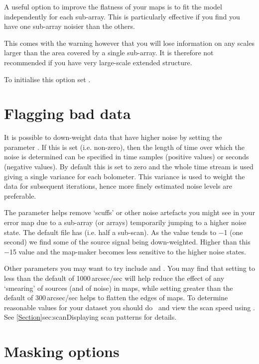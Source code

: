 \documentclass[11pt,oneside,chapters]{starlink}
\begin{document}
A useful option to improve the flatness of your maps is to fit the
 model independently for each sub-array. This is
particularly effective if you find you have one sub-array noisier than
the others.

This comes with the warning however that you will lose information on
any scales larger than the area covered by a single sub-array. It is
therefore not recommended if you have very large-scale extended
structure.

To initialise this option set .


\section{Flagging bad data}
\label{sec:noibox}

It is possible to down-weight data that have higher noise by setting
the parameter . If this is set (i.e. non-zero),
then the length of time over which the noise is determined can be
specified in time samples (positive values) or seconds (negative
values). By default this is set to zero and the whole time stream is
used giving a single variance for each bolometer. This variance is
used to weight the data for subsequent iterations, hence more finely
estimated noise levels are preferable.

The parameter  helps remove `scuffs' or other
noise artefacts you might see in your error map due to a sub-array (or
arrays) temporarily jumping to a higher noise state. The default file
has  (i.e. half a sub-scan). As the
value tends to $-$1 (one second) we find some of the source signal being
down-weighted. Higher than this $-$15 value and the map-maker becomes
less sensitive to the higher noise states.

Other parameters you may want to try include  and
. You may find that setting  to less
than the default of 1000\,arcsec/sec will help reduce the effect of any
`smearing' of sources (and of noise) in maps, while setting
 greater than the default of 300\,arcsec/sec helps to
flatten the edges of maps. To determine reasonable values for your
 dataset you should do \jcmtstate\ and view the scan speed using
\topcat. See \cref{Section}{sec:scan}{Displaying scan patterns} for
details.


\section{Masking options}
\label{sec:mask}
\end{document}
